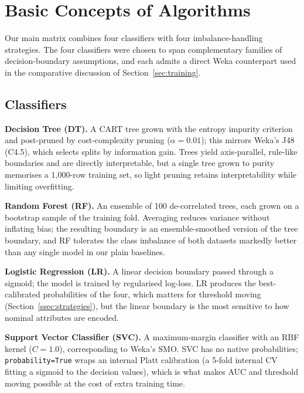 
\section{Basic Concepts of Algorithms}
\label{sec:algorithms}

Our main matrix combines four classifiers with four imbalance-handling
strategies. The four classifiers were chosen to span complementary
families of decision-boundary assumptions, and each admits a direct
Weka counterpart used in the comparative discussion of
Section~\ref{sec:training}.

\subsection{Classifiers}
\textbf{Decision Tree (DT).} A CART tree grown with the entropy
impurity criterion and post-pruned by cost-complexity pruning
($\alpha=0.01$); this mirrors Weka's J48 (C4.5), which selects splits
by information gain. Trees yield axis-parallel, rule-like boundaries
and are directly interpretable, but a single tree grown to purity
memorises a 1{,}000-row training set, so light pruning retains
interpretability while limiting overfitting.

\textbf{Random Forest (RF).} An ensemble of 100 de-correlated trees,
each grown on a bootstrap sample of the training fold. Averaging
reduces variance without inflating bias; the resulting boundary is an
ensemble-smoothed version of the tree boundary, and RF tolerates the
class imbalance of both datasets markedly better than any single model
in our plain baselines.

\textbf{Logistic Regression (LR).} A linear decision boundary passed
through a sigmoid; the model is trained by regularised log-loss. LR
produces the best-calibrated probabilities of the four, which matters
for threshold moving (Section~\ref{ssec:strategies}), but the linear
boundary is the most sensitive to how nominal attributes are encoded.

\textbf{Support Vector Classifier (SVC).} A maximum-margin classifier
with an RBF kernel ($C=1.0$), corresponding to Weka's SMO. SVC has no
native probabilities; \texttt{probability=True} wraps an internal
Platt calibration (a 5-fold internal CV fitting a sigmoid to the
decision values), which is what makes AUC and threshold moving
possible at the cost of extra training time.

